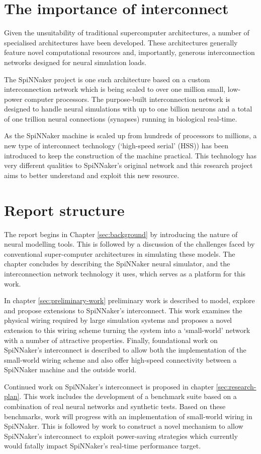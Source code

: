 	\section{The importance of interconnect}
		
		Given the unsuitability of traditional supercomputer architectures, a number
		of specialised architectures have been developed. These architectures
		generally feature novel computational resources and, importantly, generous
		interconnection networks designed for neural simulation loads.
		
		The SpiNNaker project \cite{furber06} is one such architecture based on a
		custom interconnection network which is being scaled to over one million
		small, low-power computer processors. The purpose-built interconnection
		network is designed to handle neural simulations with up to one billion
		neurons and a total of one trillion neural connections (synapses) running in
		biological real-time.
		
		As the SpiNNaker machine is scaled up from hundreds of processors to
		millions, a new type of interconnect technology (`high-speed serial' (HSS))
		has been introduced to keep the construction of the machine practical. This
		technology has very different qualities to SpiNNaker's original network and
		this research project aims to better understand and exploit this new
		resource.
		
		\section{Report structure}
			
			The report begins in Chapter \ref{sec:background} by introducing the
			nature of neural modelling tools. This is followed by a discussion of the
			challenges faced by conventional super-computer architectures in
			simulating these models. The chapter concludes by describing the SpiNNaker
			neural simulator, and the interconnection network technology it uses,
			which serves as a platform for this work.
			
			In chapter \ref{sec:preliminary-work} preliminary work is described to
			model, explore and propose extensions to SpiNNaker's interconnect. This
			work examines the physical wiring required by large simulation systems and
			proposes a novel extension to this wiring scheme turning the system into a
			`small-world' network with a number of attractive properties. Finally,
			foundational work on SpiNNaker's interconnect is described to allow both
			the implementation of the small-world wiring scheme and also offer
			high-speed connectivity between a SpiNNaker machine and the outside world.
			
			Continued work on SpiNNaker's interconnect is proposed in chapter
			\ref{sec:research-plan}. This work includes the development of a benchmark
			suite based on a combination of real neural networks and synthetic tests.
			Based on these benchmarks, work will progress with an implementation of
			small-world wiring in SpiNNaker. This is followed by work to construct a
			novel mechanism to allow SpiNNaker's interconnect to exploit power-saving
			strategies which currently would fatally impact SpiNNaker's real-time
			performance target.
